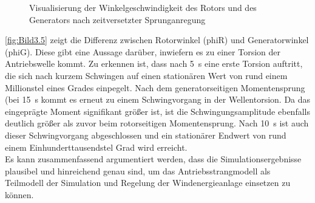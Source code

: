 \begin{figure}[H]
   \centering
   \caption[Winkelgeschwindigkeiten Antriebsstrang]{Visualisierung der Winkelgeschwindigkeit des Rotors und des Generators nach zeitversetzter Sprunganregung}
   \label{fig:Bild3.4}
\end{figure}

\autoref{fig:Bild3.5} zeigt die Differenz zwischen Rotorwinkel (\acs{phiR}) und Generatorwinkel (\ac{phiG}). Diese gibt eine Aussage darüber, inwiefern es zu einer Torsion der Antriebswelle kommt. Zu erkennen ist, dass nach \SI{5}{s} eine erste Torsion auftritt, die sich nach kurzem Schwingen auf einen stationären Wert von rund einem Millionstel eines Grades einpegelt. Nach dem generatorseitigen Momentensprung (bei \SI{15}{s} kommt es erneut zu einem Schwingvorgang in der Wellentorsion. Da das eingeprägte Moment signifikant größer ist, ist die Schwingungsamplitude ebenfalls deutlich größer als zuvor beim rotorseitigen Momentensprung. Nach \ca \SI{10}{s} ist auch dieser Schwingvorgang abgeschlossen und ein stationärer Endwert von rund einem Einhunderttausendstel Grad wird erreicht. \\
Es kann zusammenfassend argumentiert werden, dass die Simulationsergebnisse plausibel und hinreichend genau sind, um das Antriebsstrangmodell als Teilmodell der Simulation und Regelung der Windenergieanlage einsetzen zu können.

